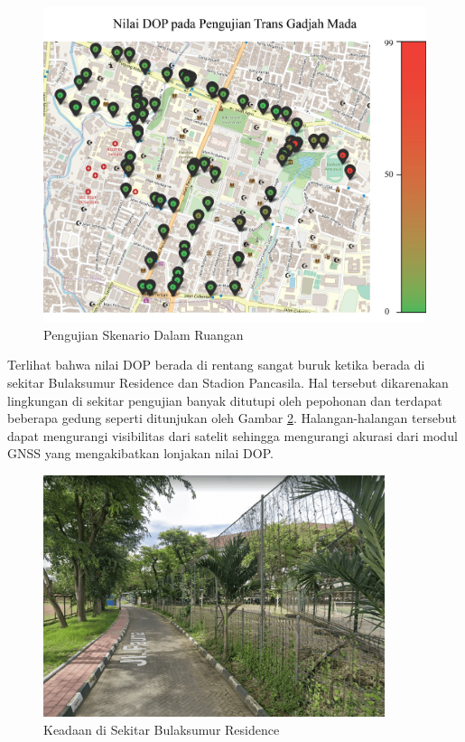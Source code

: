 \begin{figure}[H]
	\centering
	\includegraphics[width=12cm]{contents/chapter-4/pengujian-bergerak/moving-dop.jpg}
	\caption{Pengujian Skenario Dalam Ruangan}
	\label{Fig: moving-dop}
\end{figure}

Terlihat bahwa nilai DOP berada di rentang sangat buruk ketika berada di sekitar Bulaksumur Residence dan Stadion Pancasila. Hal tersebut dikarenakan lingkungan di sekitar pengujian banyak ditutupi oleh pepohonan dan terdapat beberapa gedung seperti ditunjukan oleh Gambar \ref{Fig: lp-streetview}. Halangan-halangan tersebut dapat mengurangi visibilitas dari satelit sehingga mengurangi akurasi dari modul GNSS yang mengakibatkan lonjakan nilai DOP.

\begin{figure}[H]
	\centering
	\includegraphics[width=10cm]{contents/chapter-4/pengujian-bergerak/lp-streetview.png}
	\caption{Keadaan di Sekitar Bulaksumur Residence}
	\label{Fig: lp-streetview}
\end{figure}

